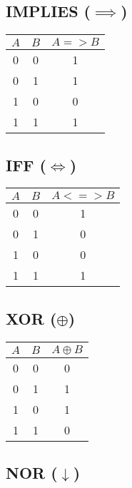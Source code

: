 \begin{multicols}{2}
\vspace{1em}

\subsection*{IMPLIES ($\implies$)}

\begin{tabular}{ccc}
\toprule
$A$ & $B$ & $A => B$ \\
\midrule
0 & 0 & 1 \\
0 & 1 & 1 \\
1 & 0 & 0 \\
1 & 1 & 1 \\
\bottomrule
\end{tabular}

\columnbreak

\subsection*{IFF ($\iff$)}

\begin{tabular}{ccc}
\toprule
$A$ & $B$ & $A <=> B$ \\
\midrule
0 & 0 & 1 \\
0 & 1 & 0 \\
1 & 0 & 0 \\
1 & 1 & 1 \\
\bottomrule
\end{tabular}

\vspace{1em}

\subsection*{XOR ($\oplus$)}

\begin{tabular}{ccc}
\toprule
$A$ & $B$ & $A \oplus B$ \\
\midrule
0 & 0 & 0 \\
0 & 1 & 1 \\
1 & 0 & 1 \\
1 & 1 & 0 \\
\bottomrule
\end{tabular}

\vspace{1em}

\subsection*{NOR ($\downarrow$)}


\end{multicols}
